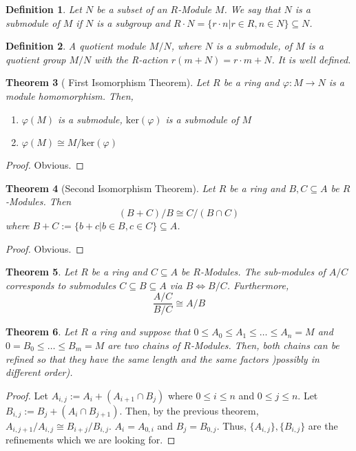 \documentclass[letterpaper, leqno, 12pt]{article}
\theoremstyle{stdthm}
\newtheorem{thm}{Theorem}
\theoremstyle{stddef}
\newtheorem{defn}[thm]{Definition}
\theoremstyle{stdnonum}
\theoremstyle{stdqands}
\theoremstyle{stdbold}
\begin{document}
\begin{defn}
Let $N$ be a subset of an $R$-Module $M$. We say that $N$ is a submodule of $M$ if $N$ is a subgroup and $R \cdot N = \{r \cdot n| r \in R, n \in N\} \subseteq N$. 
\end{defn}

\begin{defn}
A quotient module $M/N$, where $N$ is a submodule, of $M$ is a quotient group $M/N$ with the R-action $r(m+ N) = r\cdot m + N$. It is well defined. 
\end{defn}

\begin{thm} [ First Isomorphism Theorem]
Let $R$ be a ring and $\varphi: M \rightarrow N$ is a module homomorphism. Then, 
\begin{enumerate}
\item $\varphi(M)$ is a submodule, $\text{ker}(\varphi)$ is a submodule of $M$
\item $\varphi(M) \cong M/\text{ker}(\varphi)$
\end{enumerate}
\end{thm}

\begin{proof}
Obvious.
\end{proof}

\begin{thm} [Second Isomorphism Theorem]
Let $R$ be a ring and $B,C \subseteq A$ be $R$-Modules. Then 
\[ (B+C)/B \cong C/(B\cap C) \]
where $B + C := \{ b+c| b \in B, c \in C\} \subseteq A$.
\end{thm}

\begin{proof}
Obvious. 
\end{proof}

\begin{thm}
Let $R$ be a ring and $C \subseteq A$ be $R$-Modules. The sub-modules of $A/C$ corresponds to submodules $C \subseteq B \subseteq A$ via $B \Leftrightarrow B/C$. Furthermore, 
\[ \frac{A/C}{B/C} \cong A/B \]
\end{thm}

\begin{thm}
Let $R$ a ring and suppose that $0 \leq A_0 \leq A_1 \leq \dots \leq A_n = M$ and $0 = B_0 \leq \dots \leq B_m = M$ are two chains of $R$-Modules. Then, both chains can be refined so that they have the same length and the same factors )possibly in different order). 
\end{thm}

\begin{proof}
Let $A_{i,j} := A_i + (A_{i+1} \cap B_j)$ where $0 \leq i \leq n$ and $0 \leq j \leq n$. Let $B_{i,j} := B_j + (A_i \cap B_{j+1})$. Then, by the previous theorem, $A_{i,j+1}/A_{i,j} \cong B_{i+j}/B_{i,j}$. $A_i = A_{0,i}$ and $B_j = B_{0,j}$. Thus, $\{A_{i,j}\}, \{B_{i,j}\}$ are the refinements which we are looking for. 
\end{proof}
\end{document}
